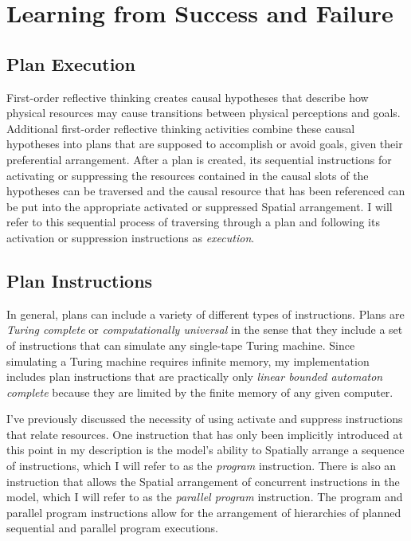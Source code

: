 \chapter{Learning from Success and Failure}
\label{chapter:learning_from_success_and_failure}

\section{Plan Execution}

First-order reflective thinking creates causal hypotheses that
describe how physical resources may cause transitions between physical
perceptions and goals.  Additional first-order reflective thinking
activities combine these causal hypotheses into plans that are
supposed to accomplish or avoid goals, given their preferential
arrangement.  After a plan is created, its sequential instructions for
activating or suppressing the resources contained in the causal slots
of the hypotheses can be traversed and the causal resource that has
been referenced can be put into the appropriate activated or
suppressed Spatial arrangement.  I will refer to this sequential
process of traversing through a plan and following its activation or
suppression instructions as \emph{execution}.

\section{Plan Instructions}

In general, plans can include a variety of different types of
instructions.  Plans are \emph{Turing complete} or
\emph{computationally universal} in the sense that they include a set
of instructions that can simulate any single-tape Turing machine.
Since simulating a Turing machine requires infinite memory, my
implementation includes plan instructions that are practically only
\emph{linear bounded automaton complete} because they are limited by
the finite memory of any given computer.

I've previously discussed the necessity of using activate and suppress
instructions that relate resources.  One instruction that has only
been implicitly introduced at this point in my description is the
model's ability to Spatially arrange a sequence of instructions, which
I will refer to as the \emph{program} instruction.  There is also an
instruction that allows the Spatial arrangement of concurrent
instructions in the model, which I will refer to as the \emph{parallel
  program} instruction.  The program and parallel program instructions
allow for the arrangement of hierarchies of planned sequential and
parallel program executions.

